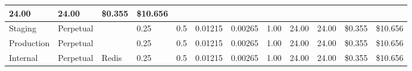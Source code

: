 \begin{landscape}
\begin{table}[!htbp]
\begin{tabular}{llllllllllll}
      \multicolumn{1}{l|}{\cellcolor[HTML]{F8696B}24.00} &
      \multicolumn{1}{l|}{\cellcolor[HTML]{F8696B}24.00} &
      \multicolumn{1}{l|}{\cellcolor[HTML]{FFEB84}\$0.355} &
      \multicolumn{1}{l|}{\cellcolor[HTML]{FFEB84}\$10.656} \\ \hline
    \multicolumn{1}{|l|}{\cellcolor[HTML]{FFFF00}Staging} &
      \multicolumn{1}{l|}{\cellcolor[HTML]{C6E0B4}Perpetual} &
      \multicolumn{1}{l|}{\cellcolor[HTML]{31648C}{\color[HTML]{FFFFFF} PostgreSQL}} &
      \multicolumn{1}{l|}{\cellcolor[HTML]{F8696B}0.25} &
      \multicolumn{1}{l|}{\cellcolor[HTML]{F8696B}0.5} &
      \multicolumn{1}{l|}{\cellcolor[HTML]{63BE7B}0.01215} &
      \multicolumn{1}{l|}{\cellcolor[HTML]{63BE7B}0.00265} &
      \multicolumn{1}{l|}{\cellcolor[HTML]{FFEB84}1.00} &
      \multicolumn{1}{l|}{\cellcolor[HTML]{F8696B}24.00} &
      \multicolumn{1}{l|}{\cellcolor[HTML]{F8696B}24.00} &
      \multicolumn{1}{l|}{\cellcolor[HTML]{FFEB84}\$0.355} &
      \multicolumn{1}{l|}{\cellcolor[HTML]{FFEB84}\$10.656} \\ \hline
    \multicolumn{1}{|l|}{\cellcolor[HTML]{EFC321}Production} &
      \multicolumn{1}{l|}{\cellcolor[HTML]{C6E0B4}Perpetual} &
      \multicolumn{1}{l|}{\cellcolor[HTML]{31648C}{\color[HTML]{FFFFFF} PostgreSQL}} &
      \multicolumn{1}{l|}{\cellcolor[HTML]{F8696B}0.25} &
      \multicolumn{1}{l|}{\cellcolor[HTML]{F8696B}0.5} &
      \multicolumn{1}{l|}{\cellcolor[HTML]{63BE7B}0.01215} &
      \multicolumn{1}{l|}{\cellcolor[HTML]{63BE7B}0.00265} &
      \multicolumn{1}{l|}{\cellcolor[HTML]{FFEB84}1.00} &
      \multicolumn{1}{l|}{\cellcolor[HTML]{F8696B}24.00} &
      \multicolumn{1}{l|}{\cellcolor[HTML]{F8696B}24.00} &
      \multicolumn{1}{l|}{\cellcolor[HTML]{FFEB84}\$0.355} &
      \multicolumn{1}{l|}{\cellcolor[HTML]{FFEB84}\$10.656} \\ \hline
    \multicolumn{1}{|l|}{\cellcolor[HTML]{92D050}Internal} &
      \multicolumn{1}{l|}{\cellcolor[HTML]{C6E0B4}Perpetual} &
      \multicolumn{1}{l|}{\cellcolor[HTML]{FF3B3B}Redis} &
      \multicolumn{1}{l|}{\cellcolor[HTML]{F8696B}0.25} &
      \multicolumn{1}{l|}{\cellcolor[HTML]{F8696B}0.5} &
      \multicolumn{1}{l|}{\cellcolor[HTML]{63BE7B}0.01215} &
      \multicolumn{1}{l|}{\cellcolor[HTML]{63BE7B}0.00265} &
      \multicolumn{1}{l|}{\cellcolor[HTML]{FFEB84}1.00} &
      \multicolumn{1}{l|}{\cellcolor[HTML]{F8696B}24.00} &
      \multicolumn{1}{l|}{\cellcolor[HTML]{F8696B}24.00} &
      \multicolumn{1}{l|}{\cellcolor[HTML]{FFEB84}\$0.355} &
      \multicolumn{1}{l|}{\cellcolor[HTML]{FFEB84}\$10.656} \\ \hline

\end{tabular}
\end{table}
\end{landscape}
